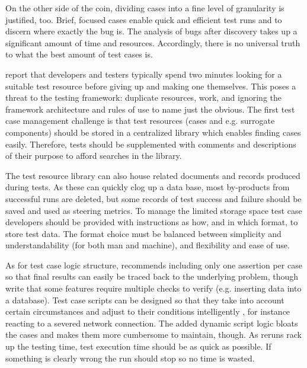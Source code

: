 \documentclass[12pt,a4paper,oneside,pdftex]{report}
\begin{document}
On the other side of the coin, dividing cases into a fine level of granularity is justified, too. Brief, focused cases enable quick and efficient test runs and to discern where exactly the bug is. The analysis of bugs after discovery takes up a significant amount of time and resources. Accordingly, there is no universal truth to what the best amount of test cases is.

\citep{fewster1999software} report that developers and testers typically spend two minutes looking for a suitable test resource before giving up and making one themselves. This poses a threat to the testing framework: duplicate resources, work, and ignoring the framework architecture and rules of use to name just the obvious. The first test case management challenge is that test resources (cases and e.g. surrogate components) should be stored in a centralized library which enables finding cases easily. Therefore, tests should be supplemented with comments and descriptions of their purpose to afford searches in the library.

The test resource library can also house related documents and records produced during tests. As these can quickly clog up a data base, most by-products from successful runs are deleted, but some records of test success and failure should be saved and used as steering metrics. \citep{fewster1999software} To manage the limited storage space test case developers should be provided with instructions as how, and in which format, to store test data. The format choice must be balanced between simplicity and understandability (for both man and machine), and flexibility and ease of use.


As for test case logic structure, \citet{duvall2007continuous} recommends including only one assertion per case so that final results can easily be traced back to the underlying problem, though \citet{fewster1999software} write that some features require multiple checks to verify (e.g. inserting data into a database). Test case scripts can be designed so that they take into account certain circumstances and adjust to their conditions intelligently \citep{fewster1999software}, for instance reacting to a severed network connection. The added dynamic script logic bloats the cases and makes them more cumbersome to maintain, though. As reruns rack up the testing time, test execution time should be as quick as possible. If something is clearly wrong the run should stop so no time is wasted.
\end{document}
